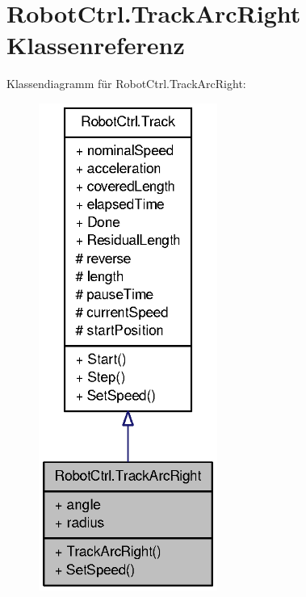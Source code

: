 \hypertarget{class_robot_ctrl_1_1_track_arc_right}{
\section{RobotCtrl.TrackArcRight Klassenreferenz}
\label{class_robot_ctrl_1_1_track_arc_right}
}


Klassendiagramm für RobotCtrl.TrackArcRight:\nopagebreak
\begin{figure}[H]
\begin{center}
\leavevmode
\includegraphics[width=166pt]{class_robot_ctrl_1_1_track_arc_right__inherit__graph}
\end{center}
\end{figure}


